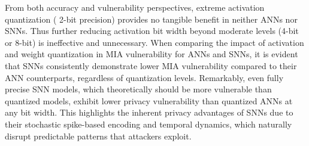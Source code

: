 From both accuracy and vulnerability perspectives, extreme activation quantization ( 2-bit precision) provides no tangible benefit in neither ANNs nor SNNs. Thus further reducing activation bit width beyond moderate levels (4-bit or 8-bit) is ineffective and unnecessary. 
When comparing the impact of activation and weight quantization in MIA vulnerability for ANNs and SNNs, it is evident that SNNs consistently demonstrate lower MIA vulnerability compared to their ANN counterparts, regardless of quantization levels. Remarkably, even fully precise SNN models, which theoretically should be more vulnerable than quantized models, exhibit lower privacy vulnerability than quantized ANNs at any bit width. This highlights the inherent privacy advantages of SNNs due to their stochastic spike-based encoding and temporal dynamics, which naturally disrupt predictable patterns that attackers exploit. 









